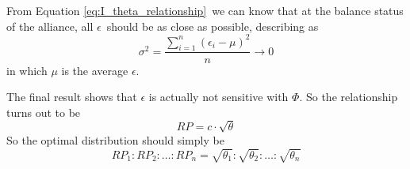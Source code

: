 From Equation \ref{eq:I_theta_relationship}\ we can know that at the balance status of the alliance, all $\epsilon$\ should be as close as possible, describing as
\[  \sigma^{2} = \frac{\sum_{i=1}^{n}(\epsilon_i-\mu)^{2}}{n} \to 0  \]
in which $\mu$ is the average $\epsilon$.

The final result shows that $\epsilon$ is actually not sensitive with $\Phi$. So the relationship turns out to be
\[  RP = c \cdot \sqrt{\theta}  \]
So the optimal distribution should simply be
\[  RP_1 : RP_2 : \ldots : RP_n = \sqrt{\theta_1} : \sqrt{\theta_2} : \ldots : \sqrt{\theta_n}  \]